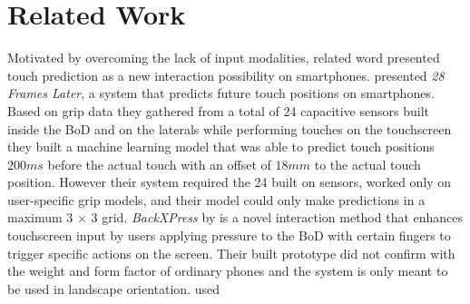 \section{Related Work}
\label{sec:relw}
Motivated by overcoming the lack of input modalities, related word presented touch prediction as a new interaction possibility on smartphones.
\citeauthor{MohdNoor2016} \cite{MohdNoor2016} presented \textit{28 Frames Later}, a system that predicts future touch positions on smartphones. 
Based on grip data they gathered from a total of 24 capacitive sensors built inside the BoD and on the laterals while performing touches on the touchscreen they built a machine learning model that was able to predict touch positions $ 200ms $ before the actual touch with an offset of $ 18mm $ to the actual touch position.
However their system required the 24 built on sensors, worked only on user-specific grip models, and their model could only make predictions in a maximum 3 $\times$ 3 grid.
\textit{BackXPress} by \citeauthor{Corsten2017} \cite{Corsten2017} is a novel interaction method that enhances touchscreen input by users applying pressure to the BoD with certain fingers to trigger specific actions on the screen.
Their built prototype did not confirm with the weight and form factor of ordinary phones and the system is only meant to be used in landscape orientation.
\citeauthor{Lochtefeld2015} \cite{Lochtefeld2015} used 


